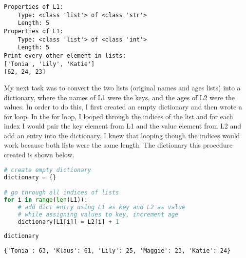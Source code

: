 \documentclass[journal]{IEEEtran}
\begin{document}
\begin{lstlisting}[caption={List Output of Properties and Every Other Element}]
Properties of L1:
    Type: <class 'list'> of <class 'str'>
    Length: 5
Properties of L1:
    Type: <class 'list'> of <class 'int'>
    Length: 5
Print every other element in lists:
['Tonia', 'Lily', 'Katie']
[62, 24, 23]
\end{lstlisting}

My next task was to convert the two lists (original names and ages lists) into a dictionary, where the names of L1 were the keys, and the ages of L2 were the values. In order to do this, I first created an empty dictionary and then wrote a for loop. In the for loop, I looped through the indices of the list and for each index I would pair the key element from L1 and the value element from L2 and add an entry into the dictionary. I knew that looping though the indices would work because both lists were the same length. The dictionary this procedure created is shown below. 
\begin{lstlisting}[language=Python, caption=Instantiating a Dictionary]
# create empty dictionary 
dictionary = {}

# go through all indices of lists
for i in range(len(L1)):
    # add dict entry using L1 as key and L2 as value
    # while assigning values to key, increment age
    dictionary[L1[i]] = L2[i] + 1
    
dictionary
\end{lstlisting}

\begin{lstlisting}[caption={Dictionary Output}]
{'Tonia': 63, 'Klaus': 61, 'Lily': 25, 'Maggie': 23, 'Katie': 24}    
\end{lstlisting}
\end{document}

